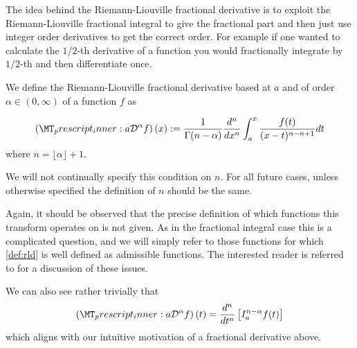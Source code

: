 The idea behind the Riemann-Liouville fractional derivative is to exploit the Riemann-Liouville fractional integral to give the fractional part and then just use integer order derivatives to get the correct order. For example if one wanted to calculate the $ 1/2$-th derivative of a function you would fractionally integrate by $1/2$-th and then differentiate once.
\begin{mdframed}[innertopmargin=10pt]
\begin{definition}
\label{def:rld}
We define the Riemann-Liouville fractional derivative based at $ a $ and of order $ \alpha \in (0, \infty) $ of a function $ f $ as



\begin{align}
    \rld{a}{}{\alpha}{f}(x) := \frac{1}{\Gamma(n-\alpha)} \frac{d^n}{dx^n} \int_{a}^{x} \frac{f(t)}{(x-t)^{\alpha - n + 1}} dt
\end{align}
where $ n = \lfloor \alpha \rfloor + 1 $.
\end{definition}
\end{mdframed}
We will not continually specify this condition on $ n $. For all future cases, unless otherwise specified the definition of $ n $ should be the same.


Again, it should be observed that the precise definition of which functions this transform operates on is not given. As in the fractional integral case this is a complicated question, and we will simply refer to those functions for which \eqref{def:rld} is well defined as admissible functions. The interested reader is referred to \cite{Samko1993} for a discussion of these issues.

We can also see rather trivially that
\begin{align}
    \label{eq:rld_rli_rel}
    \left(\prescript{}{a}{\mathcal{D}}^\alpha{f}\right)(t) = \frac{d^n}{dt^n}\left[ I_a^{n-\alpha}f(t) \right]
\end{align}
which aligns with our intuitive motivation of a fractional derivative above.

